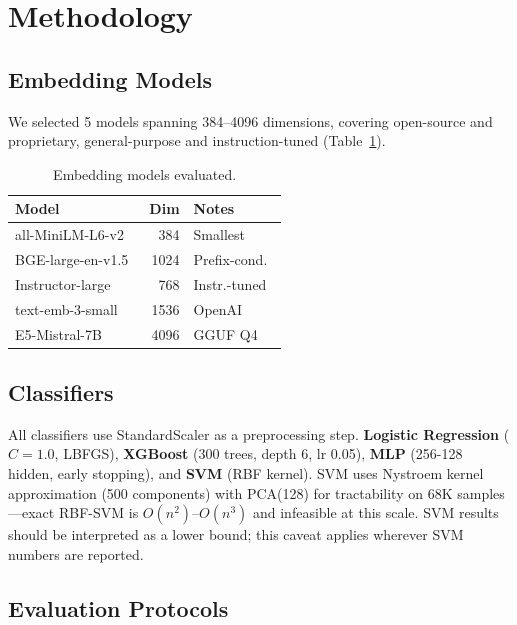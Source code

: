 \documentclass[conference]{IEEEtran}
\begin{document}
\section{Methodology}
\label{sec:method}

\subsection{Embedding Models}

We selected 5 models spanning 384--4096 dimensions, covering open-source and
proprietary, general-purpose and instruction-tuned (Table~\ref{tab:embeddings}).

\begin{table}[t]
\centering
\footnotesize
\caption{Embedding models evaluated.}
\label{tab:embeddings}
\begin{tabular}{lrl}
\toprule
\textbf{Model} & \textbf{Dim} & \textbf{Notes} \\
\midrule
all-MiniLM-L6-v2~\cite{reimers2019sentencebert} & 384 & Smallest \\
BGE-large-en-v1.5~\cite{xiao2023cpack} & 1024 & Prefix-cond.\ \\
Instructor-large~\cite{su2023instructor} & 768 & Instr.-tuned \\
text-emb-3-small~\cite{openai2024embeddings} & 1536 & OpenAI \\
E5-Mistral-7B~\cite{wang2024e5mistral} & 4096 & GGUF Q4 \\
\bottomrule
\end{tabular}
\end{table}

\subsection{Classifiers}

All classifiers use StandardScaler as a preprocessing step.
\textbf{Logistic Regression} ($C{=}1.0$, LBFGS),
\textbf{XGBoost} (300 trees, depth 6, lr 0.05),
\textbf{MLP} (256-128 hidden, early stopping), and
\textbf{SVM} (RBF kernel).
SVM uses Nystroem kernel approximation (500 components) with PCA(128) for
tractability on 68K samples---exact RBF-SVM is $O(n^2)$--$O(n^3)$ and
infeasible at this scale. SVM results should be interpreted as a lower bound;
this caveat applies wherever SVM numbers are reported.

\subsection{Evaluation Protocols}
\end{document}
